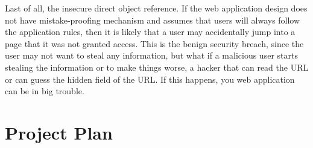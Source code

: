 \documentclass[12pt, a4paper]{article}
\begin{document}
Last of all, the insecure direct object reference. If the web application design does not have mistake-proofing mechanism and assumes that users will always follow the application rules, then it is likely that a user may accidentally jump into a page that it was not granted access. This is the benign security breach, since the user may not want to steal any information, but what if a malicious user starts stealing the information or to make things worse, a hacker that can read the URL or can guess the hidden field of the URL\cite{Michael}. If this happens, you web application can be in big trouble.


\section{Project Plan}



\end{document}

